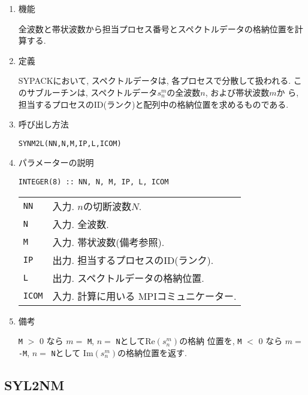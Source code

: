 \documentclass[a4j]{jsarticle}
\begin{document}
\begin{enumerate}

\item 機能 

全波数と帯状波数から担当プロセス番号とスペクトルデータの格納位置を計算する.  

\item 定義

SYPACKにおいて, スペクトルデータは, 各プロセスで分散して扱われる.
このサブルーチンは, スペクトルデータ$s^m_n$の全波数$n$, 
および帯状波数$m$か
ら, 担当するプロセスのID(ランク)と配列中の格納位置を求めるものである.

\item 呼び出し方法 
    
\texttt{SYNM2L(NN,N,M,IP,L,ICOM)}
  
\item パラメーターの説明

\begin{verbatim}
INTEGER(8) :: NN, N, M, IP, L, ICOM
\end{verbatim}    

\begin{tabular}{ll}
\texttt{NN} & 入力. $n$の切断波数$N$.\\
\texttt{N} & 入力. 全波数.\\
\texttt{M} & 入力. 帯状波数(備考参照).\\
\texttt{IP} & 出力. 担当するプロセスのID(ランク).\\
\texttt{L} & 出力. スペクトルデータの格納位置.\\
\texttt{ICOM} & 入力. 計算に用いる MPIコミュニケーター.
\end{tabular}

\item 備考

\texttt{M} $>$ 0 なら $m=$ \texttt{M}, $n=$ \texttt{N}として$\mbox{Re}(s^m_n)$の格納
位置を, \texttt{M} $<$ 0 なら $m=$ \texttt{-M}, $n=$ \texttt{N}として
$\mbox{Im}(s^m_n)$の格納位置を返す.

\end{enumerate}


\subsection{SYL2NM}
\end{document}

